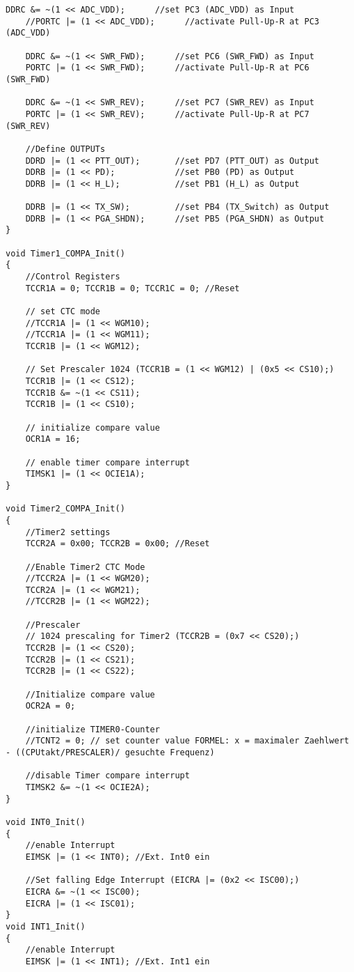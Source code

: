 \begin{lstlisting}[language=Arduino]
	DDRC &= ~(1 << ADC_VDD);      //set PC3 (ADC_VDD) as Input  
	//PORTC |= (1 << ADC_VDD);      //activate Pull-Up-R at PC3 (ADC_VDD)
	
	DDRC &= ~(1 << SWR_FWD);      //set PC6 (SWR_FWD) as Input  
	PORTC |= (1 << SWR_FWD);      //activate Pull-Up-R at PC6 (SWR_FWD)
	
	DDRC &= ~(1 << SWR_REV);      //set PC7 (SWR_REV) as Input  
	PORTC |= (1 << SWR_REV);      //activate Pull-Up-R at PC7 (SWR_REV)
	
	//Define OUTPUTs
	DDRD |= (1 << PTT_OUT);       //set PD7 (PTT_OUT) as Output
	DDRB |= (1 << PD);            //set PB0 (PD) as Output
	DDRB |= (1 << H_L);           //set PB1 (H_L) as Output
	
	DDRB |= (1 << TX_SW);         //set PB4 (TX_Switch) as Output
	DDRB |= (1 << PGA_SHDN);      //set PB5 (PGA_SHDN) as Output
}

void Timer1_COMPA_Init()
{
	//Control Registers
	TCCR1A = 0; TCCR1B = 0; TCCR1C = 0; //Reset
	
	// set CTC mode
	//TCCR1A |= (1 << WGM10);
	//TCCR1A |= (1 << WGM11);
	TCCR1B |= (1 << WGM12);
	
	// Set Prescaler 1024 (TCCR1B = (1 << WGM12) | (0x5 << CS10);)
	TCCR1B |= (1 << CS12);
	TCCR1B &= ~(1 << CS11);
	TCCR1B |= (1 << CS10);
	
	// initialize compare value
	OCR1A = 16;
	
	// enable timer compare interrupt
	TIMSK1 |= (1 << OCIE1A);
}

void Timer2_COMPA_Init()
{
	//Timer2 settings
	TCCR2A = 0x00; TCCR2B = 0x00; //Reset
	
	//Enable Timer2 CTC Mode
	//TCCR2A |= (1 << WGM20);
	TCCR2A |= (1 << WGM21);
	//TCCR2B |= (1 << WGM22);
	
	//Prescaler
	// 1024 prescaling for Timer2 (TCCR2B = (0x7 << CS20);)
	TCCR2B |= (1 << CS20);
	TCCR2B |= (1 << CS21);
	TCCR2B |= (1 << CS22);
	
	//Initialize compare value
	OCR2A = 0;
	
	//initialize TIMER0-Counter
	//TCNT2 = 0; // set counter value FORMEL: x = maximaler Zaehlwert - ((CPUtakt/PRESCALER)/ gesuchte Frequenz)
	
	//disable Timer compare interrupt
	TIMSK2 &= ~(1 << OCIE2A);
}

void INT0_Init()
{
	//enable Interrupt
	EIMSK |= (1 << INT0); //Ext. Int0 ein
	
	//Set falling Edge Interrupt (EICRA |= (0x2 << ISC00);)
	EICRA &= ~(1 << ISC00);
	EICRA |= (1 << ISC01);
}
void INT1_Init()
{
	//enable Interrupt
	EIMSK |= (1 << INT1); //Ext. Int1 ein
	

\end{lstlisting}

